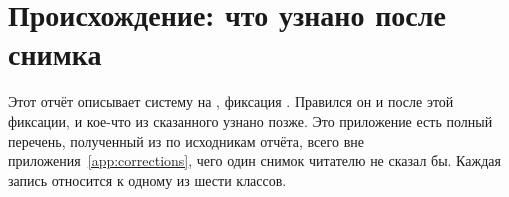 \section{Происхождение: что узнано после снимка}
\label{app:provenance}

Этот отчёт описывает систему на , фиксация . Правился он и после
этой фиксации, и кое-что из сказанного узнано позже. Это приложение есть полный перечень, полученный
из  по исходникам отчёта, всего вне приложения~\ref{app:corrections}, чего один снимок читателю не
сказал бы. Каждая запись относится к одному из шести классов.

